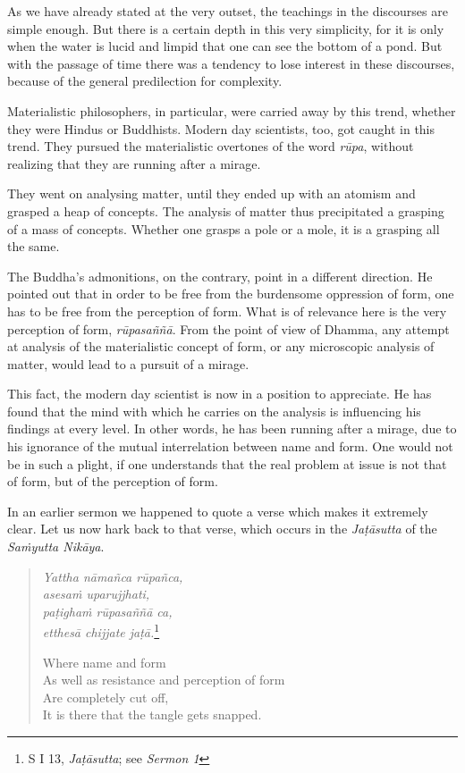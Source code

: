 As we have already stated at the very outset, the teachings in the discourses are simple enough. But there is a certain depth in this very simplicity, for it is only when the water is lucid and limpid that one can see the bottom of a pond. But with the passage of time there was a tendency to lose interest in these discourses, because of the general predilection for complexity.

Materialistic philosophers, in particular, were carried away by this trend, whether they were Hindus or Buddhists. Modern day scientists, too, got caught in this trend. They pursued the materialistic overtones of the word \emph{rūpa}, without realizing that they are running after a mirage.

They went on analysing matter, until they ended up with an atomism and grasped a heap of concepts. The analysis of matter thus precipitated a grasping of a mass of concepts. Whether one grasps a pole or a mole, it is a grasping all the same.

The Buddha's admonitions, on the contrary, point in a different direction. He pointed out that in order to be free from the burdensome oppression of form, one has to be free from the perception of form. What is of relevance here is the very perception of form, \emph{rūpasaññā}. From the point of view of Dhamma, any attempt at analysis of the materialistic concept of form, or any microscopic analysis of matter, would lead to a pursuit of a mirage.

This fact, the modern day scientist is now in a position to appreciate. He has found that the mind with which he carries on the analysis is influencing his findings at every level. In other words, he has been running after a mirage, due to his ignorance of the mutual interrelation between name and form. One would not be in such a plight, if one understands that the real problem at issue is not that of form, but of the perception of form.

In an earlier sermon we happened to quote a verse which makes it extremely clear. Let us now hark back to that verse, which occurs in the \emph{Jaṭāsutta} of the \emph{Saṁyutta Nikāya}.

\begin{quote}
\emph{Yattha nāmañca rūpañca,}\\
\emph{asesaṁ uparujjhati,}\\
\emph{paṭighaṁ rūpasaññā ca,}\\
\emph{etthesā chijjate jaṭā.}\footnote{S I 13, \emph{Jaṭāsutta}; see \emph{Sermon 1}}

Where name and form\\
As well as resistance and perception of form\\
Are completely cut off,\\
It is there that the tangle gets snapped.
\end{quote}


